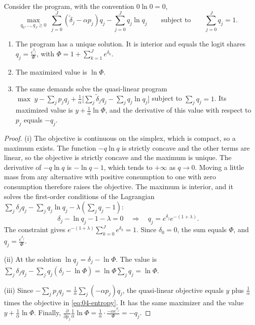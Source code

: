\begin{proposition}\label{prop:04-logit-entropy}
Consider the program, with the convention $0\ln 0 = 0$,
\begin{equation}\label{eq:04-entropy}
\max_{q_0, \dots, q_J \ge 0}\; \sum_{j=0}^J(\tilde\delta_j - \alpha p_j)q_j - \sum_{j=0}^J q_j\ln q_j
\qquad\text{subject to}\qquad \sum_{j=0}^J q_j = 1 .
\end{equation}
\begin{enumerate}[label=(\roman*)]
\item The program has a unique solution. It is interior and equals the logit shares
$q_j = \frac{e^{\delta_j}}{\Phi}$, with $\Phi = 1 + \sum_{k=1}^J e^{\delta_k}$.
\item The maximized value is $\ln\Phi$.
\item The same demands solve the quasi-linear program
$\max\; y - \sum_j p_jq_j + \frac{1}{\alpha}\big[\sum_j\tilde\delta_jq_j - \sum_j q_j\ln q_j\big]$ subject to
$\sum_j q_j = 1$. Its maximized value is $y + \frac{1}{\alpha}\ln\Phi$, and the derivative of this value with respect
to $p_j$ equals $-q_j$.
\end{enumerate}
\end{proposition}

\begin{proof}
(i) The objective is continuous on the simplex, which is compact, so a maximum exists. The function
$-q\ln q$ is strictly concave and the other terms are linear, so the objective is strictly concave and the maximum
is unique. The derivative of $-q\ln q$ is $-\ln q - 1$, which tends to $+\infty$ as $q \to 0$. Moving a little
mass from any alternative with positive consumption to one with zero consumption therefore raises the objective.
The maximum is interior, and it solves the first-order conditions of the Lagrangian
$\sum_j\delta_jq_j - \sum_jq_j\ln q_j - \lambda(\sum_j q_j - 1)$:
\begin{equation*}
\delta_j - \ln q_j - 1 - \lambda = 0
\quad\Longrightarrow\quad
q_j = e^{\delta_j}e^{-(1+\lambda)} .
\end{equation*}
The constraint gives $e^{-(1+\lambda)}\sum_{k=0}^J e^{\delta_k} = 1$. Since $\delta_0 = 0$, the sum equals $\Phi$, and
$q_j = \frac{e^{\delta_j}}{\Phi}$.

(ii) At the solution $\ln q_j = \delta_j - \ln\Phi$. The value is
$\sum_j\delta_jq_j - \sum_jq_j(\delta_j - \ln\Phi) = \ln\Phi\sum_jq_j = \ln\Phi$.

(iii) Since $-\sum_j p_jq_j = \frac{1}{\alpha}\sum_j(-\alpha p_j)q_j$, the quasi-linear objective equals $y$ plus
$\frac{1}{\alpha}$ times the objective in \eqref{eq:04-entropy}. It has the same maximizer and the value
$y + \frac{1}{\alpha}\ln\Phi$. Finally, $\frac{\partial}{\partial p_j}\frac{1}{\alpha}\ln\Phi = \frac{1}{\alpha}\cdot\frac{-\alpha e^{\delta_j}}{\Phi} = -q_j$.
\end{proof}

